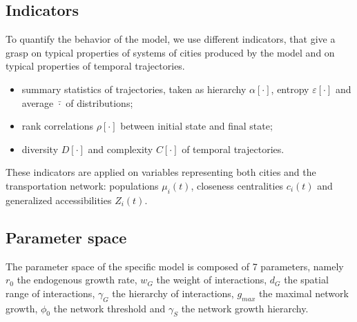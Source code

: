 

\subsection{Indicators}

To quantify the behavior of the model, we use different indicators, that give a grasp on typical properties of systems of cities produced by the model and on typical properties of temporal trajectories. 
\begin{itemize}
	\item summary statistics of trajectories, taken as hierarchy $\alpha\left[\cdot\right]$, entropy $\varepsilon\left[\cdot\right]$ and average $\bar{\cdot}$ of distributions;
	\item rank correlations $\rho\left[\cdot\right]$ between initial state and final state;
	\item diversity $D\left[\cdot\right]$ and complexity $C\left[\cdot\right]$ of temporal trajectories.
\end{itemize}

These indicators are applied on variables representing both cities and the transportation network: populations $\mu_i(t)$, closeness centralities $c_i (t)$ and generalized accessibilities $Z_i (t)$.


\subsection{Parameter space}

The parameter space of the specific model is composed of 7 parameters, namely $r_0$ the endogenous growth rate, $w_G$ the weight of interactions, $d_G$ the spatial range of interactions, $\gamma_G$ the hierarchy of interactions, $g_{max}$ the maximal network growth, $\phi_0$ the network threshold and $\gamma_S$ the network growth hierarchy. 




